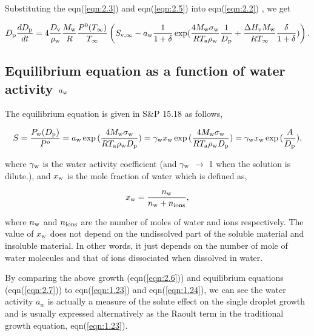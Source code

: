\documentclass[12pt]{article}
\begin{document}
Substituting the eqn(\ref{eqn:2.3}) and eqn(\ref{eqn:2.5}) into eqn(\ref{eqn:2.2}) , we get

\begin{equation}\label{eqn:2.6}
D_{\rm p}\frac{dD_{\rm p}}{dt}=4 \frac{D_{\rm v}} {\rho_{\rm w}} \frac{M_{\rm w}}{R} \frac{P^{\rm 0}(T_{\infty})} {T_{\infty}} \left(S_{\rm v, \infty} - a_{\rm w} \frac{1}{1+\delta} \exp(\frac{4 M_{\rm w}\sigma_{\rm w}}{R T_{\rm a} \rho_{\rm w}}\frac{1}{D_{\rm p}}+\frac{\Delta H_{\rm v} M_{\rm w}}{R T_{\infty}} \frac{\delta}{1+\delta})\right).
\end{equation}

\subsection{Equilibrium equation as a function of water activity $a_{\rm w}$}

The equilibrium equation is given in S$\&$P 15.18 as follows, 

\begin{equation}\label{eqn:2.7}
S=\frac{P_{\rm w}(D_{\rm p})}{P^{o}}=a_{\rm w}\exp{(\frac{4 M_{\rm w} \sigma_{\rm w}}{R T_{\rm a} \rho_{\rm w} D_{\rm p}})}=\gamma_{\rm w}x_{\rm w}\exp{(\frac{4 M_{\rm w} \sigma_{\rm w}}{R T_{\rm a} \rho_{\rm w} D_{\rm p}})}=\gamma_{\rm w}x_{\rm w}\exp{(\frac{A}{D_{\rm p}})},
\end{equation}

where $\gamma_{\rm w}$ is the water activity coefficient (and $\gamma_{\rm w}$ $\rightarrow$ 1 when the solution is dilute.), and $x_{\rm w}$ is the mole fraction of water which is defined as,

\begin{equation}\label{eqn:2.8}
x_{\rm w}=\frac{n_{\rm w}}{n_{\rm w}+n_{\rm ions}},
\end{equation}

where $n_{\rm w}$ and $n_{\rm ions}$ are the number of moles of water and ions respectively.
The value of $x_{\rm w}$ does not depend on the undissolved part of the soluble material and insoluble material. In other words, it just depends on the number of mole of water molecules and that of ions dissociated when dissolved in water.

By comparing the above growth (eqn(\ref{eqn:2.6})) and equilibrium equations (eqn(\ref{eqn:2.7})) to eqn(\ref{eqn:1.23}) and eqn(\ref{eqn:1.24}), we can see the water activity $a_{w}$ is actually a measure of the solute effect on the single droplet growth and is usually expressed alternatively as the Raoult term in the traditional growth equation, eqn(\ref{eqn:1.23}).
\end{document}
